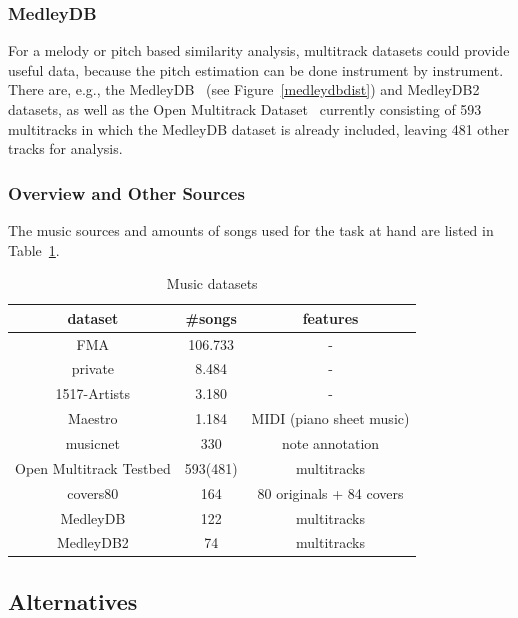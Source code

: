\subsubsection{MedleyDB}

For a melody or pitch based similarity analysis, multitrack datasets could provide useful data, because the pitch estimation can be done instrument by instrument. There are, e.g., the MedleyDB~\cite{medleydb1} (see Figure~\ref{medleydbdist}) and MedleyDB2~\cite{medleydb2} datasets, as well as the Open Multitrack Dataset~\cite{openmult1} currently consisting of 593 multitracks in which the MedleyDB dataset is already included, leaving 481 other tracks for analysis.

\subsubsection{Overview and Other Sources}

The music sources and amounts of songs used for the task at hand are listed in Table~\ref{table_dsets}.

\begin{table}[h]
	\begin{center}
		\begin{tabular}{|c||c|c|}
			\hline
			dataset & \#songs & features\\
			\hline
			\hline
			FMA & 106.733 & -\\
			\hline
			private & 8.484 & -\\
			\hline
			1517-Artists & 3.180 & -\\
			\hline
			Maestro & 1.184 & MIDI (piano sheet music)\\
			\hline
			musicnet & 330  & note annotation\\
			\hline
			Open Multitrack Testbed & 593(481) & multitracks\\
			\hline
			covers80 & 164  & 80 originals + 84 covers\\
			\hline
			MedleyDB &  122  & multitracks\\
			\hline
			MedleyDB2 &  74  & multitracks\\
			\hline
		\end{tabular}
	\end{center}
	\caption{Music datasets}
	\label{table_dsets}
\end{table}
\FloatBarrier

\subsection{Alternatives}

